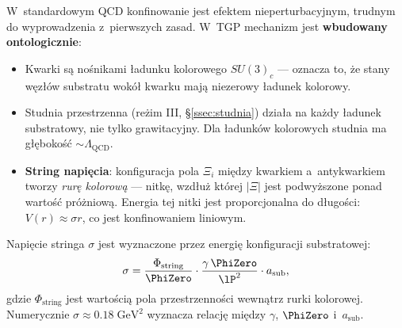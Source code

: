 \begin{remark}%
\label{rem:confinement}
W~standardowym QCD konfinowanie jest efektem nieperturbacyjnym,
trudnym do wyprowadzenia z~pierwszych zasad. W~TGP mechanizm
jest \textbf{wbudowany ontologicznie}:

\begin{itemize}[nosep]
    \item Kwarki są nośnikami ładunku kolorowego $SU(3)_c$
          --- oznacza to, że stany węzłów substratu wokół kwarku
          mają niezerowy ładunek kolorowy.
    \item Studnia przestrzenna (reżim III, \S\ref{ssec:studnia})
          działa na każdy ładunek substratowy, nie tylko
          grawitacyjny. Dla ładunków kolorowych studnia
          ma głębokość $\sim \Lambda_{\mathrm{QCD}}$.
    \item \textbf{String napięcia}: konfiguracja pola $\Xi_i$
          między kwarkiem a~antykwarkiem tworzy \emph{rurę
          kolorową} --- nitkę, wzdłuż której $|\Xi|$ jest
          podwyższone ponad wartość próżniową. Energia tej
          nitki jest proporcjonalna do długości: $V(r) \approx \sigma r$,
          co jest konfinowaniem liniowym.
\end{itemize}

Napięcie stringa $\sigma$ jest wyznaczone przez energię
konfiguracji substratowej:
\begin{equation}\label{eq:string-tension}
    \sigma = \frac{\Phi_{\mathrm{string}}}{\PhiZero} \cdot
    \frac{\gamma\,\PhiZero}{\lP^2} \cdot a_{\mathrm{sub}},
\end{equation}
gdzie $\Phi_{\mathrm{string}}$ jest wartością pola przestrzenności
wewnątrz rurki kolorowej. Numerycznie $\sigma \approx 0.18\;\mathrm{GeV}^2$
wyznacza relację między $\gamma$, $\PhiZero$ i~$a_{\mathrm{sub}}$.
\end{remark}

